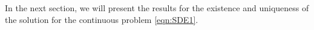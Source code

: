 
	In the next section, we will present the results for the existence and uniqueness of
the solution for the continuous problem \eqref{eqn:SDE1}.